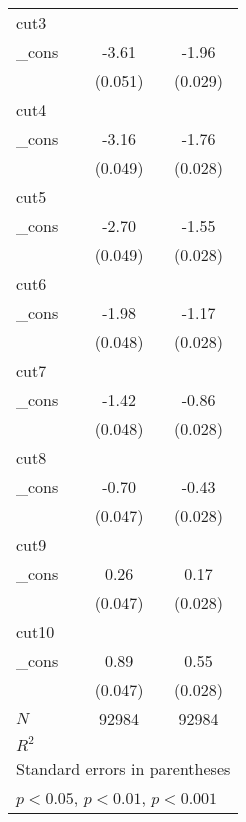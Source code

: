 {\begin{tabular}{l*{2}{c}}
\hline
cut3        &                     &                     \\
\_cons      &       -3.61\sym{***}&       -1.96\sym{***}\\
            &     (0.051)         &     (0.029)         \\
\hline
cut4        &                     &                     \\
\_cons      &       -3.16\sym{***}&       -1.76\sym{***}\\
            &     (0.049)         &     (0.028)         \\
\hline
cut5        &                     &                     \\
\_cons      &       -2.70\sym{***}&       -1.55\sym{***}\\
            &     (0.049)         &     (0.028)         \\
\hline
cut6        &                     &                     \\
\_cons      &       -1.98\sym{***}&       -1.17\sym{***}\\
            &     (0.048)         &     (0.028)         \\
\hline
cut7        &                     &                     \\
\_cons      &       -1.42\sym{***}&       -0.86\sym{***}\\
            &     (0.048)         &     (0.028)         \\
\hline
cut8        &                     &                     \\
\_cons      &       -0.70\sym{***}&       -0.43\sym{***}\\
            &     (0.047)         &     (0.028)         \\
\hline
cut9        &                     &                     \\
\_cons      &        0.26\sym{***}&        0.17\sym{***}\\
            &     (0.047)         &     (0.028)         \\
\hline
cut10       &                     &                     \\
\_cons      &        0.89\sym{***}&        0.55\sym{***}\\
            &     (0.047)         &     (0.028)         \\
\hline
\(N\)       &       92984         &       92984         \\
\(R^{2}\)   &                     &                     \\
\hline\hline
\multicolumn{3}{l}{\footnotesize Standard errors in parentheses}\\
\multicolumn{3}{l}{\footnotesize \sym{*} \(p<0.05\), \sym{**} \(p<0.01\), \sym{***} \(p<0.001\)}\\
\end{tabular}
}
